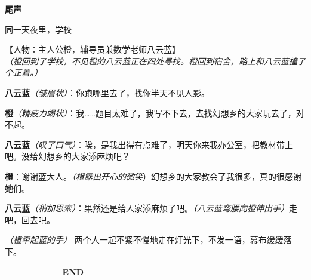 \begin{center}
    \textbf{\large 尾声}
\end{center}

{\large \heiti 同一天夜里，学校}

【人物：主人公橙，辅导员兼数学老师八云蓝】\\

\textit{（橙回到了学校，不见橙的八云蓝正在四处寻找。橙回到宿舍，路上和八云蓝撞了个正着。）}

\textbf{八云蓝}\textit{（皱眉状）}：你跑哪里去了，找你半天不见人影。

\textbf{橙}\textit{（精疲力竭状）}：我……题目太难了，我写不下去，去找幻想乡的大家玩去了，对不起。

\textbf{八云蓝}\textit{（叹了口气）}：唉，是我出得有点难了，明天你来我办公室，把教材带上吧。没给幻想乡的大家添麻烦吧？

\textbf{橙}：谢谢蓝大人。\textit{（橙露出开心的微笑}）幻想乡的大家教会了我很多，真的很感谢她们。

\textbf{八云蓝}\textit{（稍加思索）}：果然还是给人家添麻烦了吧。\textit{（八云蓝弯腰向橙伸出手）}走吧，回去吧。

\textit{（橙牵起蓝的手）
}
两个人一起不紧不慢地走在灯光下，不发一语，幕布缓缓落下。

\begin{center}
    \textbf{——————END——————}
\end{center}


